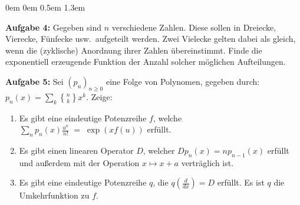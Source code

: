 \documentclass[a4paper,ngerman]{scrartcl}
\theoremstyle{definition}
\theoremstyle{plain}
\theoremstyle{remark}
\begin{document}
\begin{list}{}{0em \leftmargin0em \itemindent0.5em \itemsep 1.3em}
\item[\textbf{Aufgabe 4: }] Gegeben sind $n$ verschiedene Zahlen. Diese sollen in Dreiecke, Vierecke, Fünfecke usw.~aufgeteilt werden. Zwei Vielecke gelten dabei als gleich, wenn die (zyklische) Anordnung ihrer Zahlen übereinstimmt. Finde die exponentiell erzeugende Funktion der Anzahl solcher möglichen Aufteilungen.

\item[\textbf{Aufgabe 5: }] Sei $(p_n)_{n\geq 0}$ eine Folge von Polynomen, gegeben durch: $p_n(x) = \sum_k\genfrac\{\}{0pt}{}{n}{k}x^k$. Zeige:
\begin{enumerate}
\item Es gibt eine eindeutige Potenzreihe $f$, welche
$ \sum_n p_n(x)\frac{u^n}{n!} \; =\; \exp(xf(u))
$ erfüllt.
\item Es gibt einen linearen Operator $D$, welcher $Dp_n(x) = np_{n-1}(x)$ erfüllt und außerdem mit der Operation $x\mapsto x+a$ verträglich ist.
\item Es gibt eine eindeutige Potenzreihe $q$, die $q(\frac{d}{dx}) = D$ erfüllt. Es ist $q$ die Umkehrfunktion zu $f$.
\end{enumerate}
\end{list}
\end{document}
